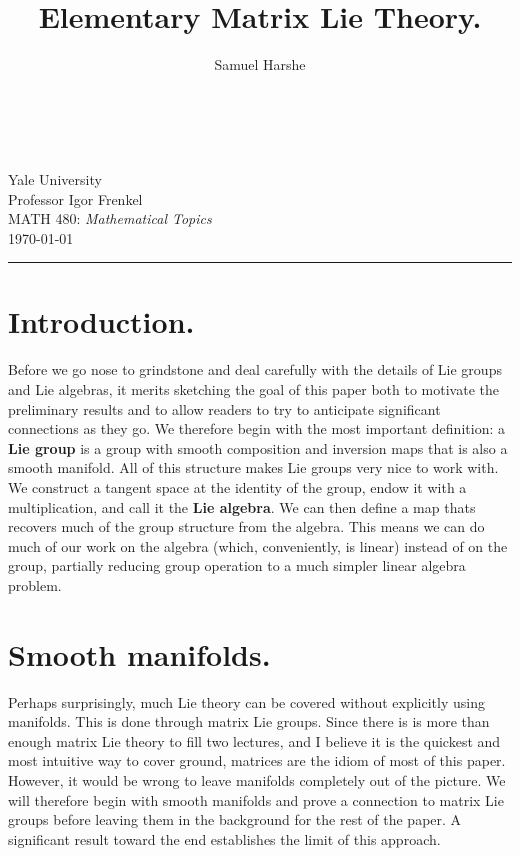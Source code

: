 \documentclass[12pt]{article}
\title{Elementary Matrix Lie Theory.}
\author{Samuel Harshe}
\theoremstyle{definition}
\theoremstyle{definition}
\theoremstyle{definition}
\theoremstyle{definition}
\theoremstyle{definition}
\theoremstyle{definition}
\theoremstyle{definition}
\theoremstyle{definition}
\begin{document}
\makeatletter
\begin{titlepage}
    \begin{center}
        \vspace*{2.5in}
        {\selectfont \huge
        \bfseries \@title}\\
        \vspace*{2.5in}
        \onehalfspacing%
        \@author\\
        Yale University\\
        Professor Igor Frenkel\\
        MATH 480: \textit{Mathematical Topics} \\
        \today \\
    \end{center}
\end{titlepage}

\onehalfspacing%
\tableofcontents
\vspace{6pt}
\noindent\rule{\textwidth}{0.5pt}

\vspace{-16pt}
\section{Introduction.}
\par{Before we go nose to grindstone and deal
carefully with the details of Lie groups and Lie
algebras, it merits sketching the goal of this
paper both to motivate the preliminary results
and to allow readers to try to anticipate
significant connections as they go. We therefore
begin with the most important definition: a
\textbf{Lie group} is a group with smooth
composition and inversion maps that is also a
smooth manifold. All of this structure makes Lie
groups very nice to work with. We construct a
tangent space at the identity of the group, endow
it with a multiplication, and call it the
\textbf{Lie algebra}. We can then define a map
thats recovers much of the group structure from
the algebra. This means we can do much of our work
on the algebra (which, conveniently, is linear)
instead of on the group, partially reducing group
operation to a much simpler linear algebra
problem.} 

\section{Smooth manifolds.}

\par{Perhaps surprisingly, much Lie theory can be
covered without explicitly using manifolds. This
is done through matrix Lie groups. Since there is
is more than enough matrix Lie theory to fill two
lectures, and I believe it is the quickest and
most intuitive way to cover ground, matrices are
the idiom of most of this paper. However, it would
be wrong to leave manifolds completely out of the
picture. We will therefore begin with smooth
manifolds and prove a connection to matrix Lie
groups before leaving them in the background for
the rest of the paper. A significant result toward
the end establishes the limit of this approach.}
\end{document}
